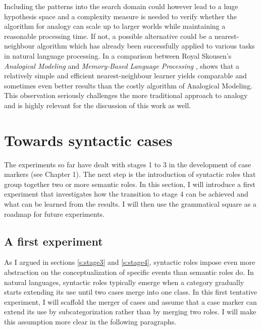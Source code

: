 Including the patterns into the search domain could however lead to a huge hypo\-the\-sis space and a complexity measure is needed to verify whether the algorithm for analogy can scale up to larger worlds while maintaining a reasonable processing time. If not, a possible alternative could be a nearest-neighbour algorithm which has already been successfully applied to various tasks in natural language processing. In a comparison between Royal Skou\-sen's {\em Analogical Modeling} \citep{skousen89analogical} and {\em Memory-Based Language Processing} \citep{daelemans05memory}, \citet{daelemans02comparing} shows that a relatively simple and efficient nearest-neighbour learner yields comparable and sometimes even better results than the costly algorithm  of Analogical Modeling. This observation seriously challenges the more traditional approach to analogy and is highly relevant for the discussion of this work as well.

\section{Towards syntactic cases}
\label{s:pattern-exp-4}

The experiments so far have dealt with stages 1 to 3 in the development of case markers (see Chapter 1). The next step is the introduction of syntactic roles that group together two or more semantic roles. In this section, I will introduce a first experiment that investigates how the transition to stage 4 can be achieved and what can be learned from the results. I will then use the grammatical square as a roadmap for future experiments.

\subsection{A first experiment}

As I argued in sections \ref{s:stage3} and \ref{s:stage4}, syntactic roles impose even more abstraction on the conceptualization of specific events than semantic roles do. In natural languages, syntactic roles typically emerge when a category gradually starts extending its use until two cases merge into one class. In this first tentative experiment, I will scaffold the merger of cases and assume that a case marker can extend its use by subcategorization rather than by merging two roles. I will make this assumption more clear in the following paragraphs.


